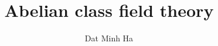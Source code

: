 





	\title{Abelian class field theory}
	
	\author{Dat Minh Ha}
	\maketitle
	
	{
      \hypersetup{} 
      \tableofcontents %
    }
	
	\newpage
	
	{
      \hypersetup{hidelinks} 
      \listoftodos
    }
    
    \newpage
	


